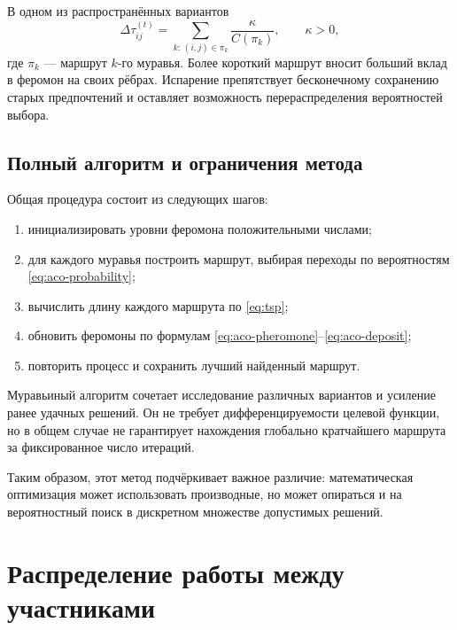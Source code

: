 \documentclass[12pt,a4paper]{article}
\begin{document}
В одном из распространённых вариантов
\begin{equation}
    \Delta\tau_{ij}^{(t)}=
        \sum_{k:\,(i,j)\in\pi_k}\frac{\kappa}{C(\pi_k)},
    \qquad \kappa>0,
    \label{eq:aco-deposit}
\end{equation}
где $\pi_k$ --- маршрут $k$-го муравья.
Более короткий маршрут вносит больший вклад
в феромон на своих рёбрах.
Испарение препятствует бесконечному сохранению
старых предпочтений и оставляет возможность
перераспределения вероятностей выбора.

\subsection{Полный алгоритм и ограничения метода}

Общая процедура состоит из следующих шагов:
\begin{enumerate}[label=\arabic*)]
    \item инициализировать уровни феромона положительными числами;
    \item для каждого муравья построить маршрут, выбирая переходы
    по вероятностям \eqref{eq:aco-probability};
    \item вычислить длину каждого маршрута по \eqref{eq:tsp};
    \item обновить феромоны по формулам
    \eqref{eq:aco-pheromone}--\eqref{eq:aco-deposit};
    \item повторить процесс и сохранить лучший найденный маршрут.
\end{enumerate}

Муравьиный алгоритм сочетает исследование различных вариантов
и усиление ранее удачных решений. Он не требует
дифференцируемости целевой функции, но в общем случае
не гарантирует нахождения глобально кратчайшего маршрута
за фиксированное число итераций.

Таким образом, этот метод подчёркивает важное различие:
математическая оптимизация может использовать производные,
но может опираться и на вероятностный поиск
в дискретном множестве допустимых решений.

\section{Распределение работы между участниками}
\end{document}
